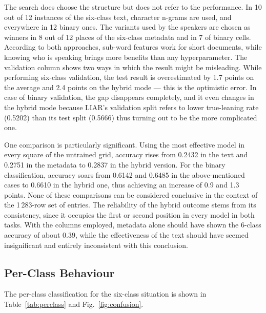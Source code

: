 \documentclass[10pt,twocolumn,twoside,a4paper]{article}
\begin{document}
The search does choose the structure but does not refer to the performance. In 10 out of 12 instances of the six-class text, character n-grams are used, and everywhere in 12 binary ones. The variants used by the speakers are chosen as winners in 8 out of 12 places of the six-class metadata and in 7 of binary cells. According to both approaches, sub-word features work for short documents, while knowing who is speaking brings more benefits than any hyperparameter. The validation column shows two ways in which the result might be misleading. While performing six-class validation, the test result is overestimated by 1.7 points on the average and 2.4 points on the hybrid mode --- this is the optimistic error. In case of binary validation, the gap disappears completely, and it even changes in the hybrid mode because LIAR's validation split refers to lower true-leaning rate (0.5202) than its test split (0.5666) thus turning out to be the more complicated one.

One comparison is particularly significant. Using the most effective model in every square of the untrained grid, accuracy rises from 0.2432 in the text and 0.2751 in the metadata to 0.2837 in the hybrid version. For the binary classification, accuracy soars from 0.6142 and 0.6485 in the above-mentioned cases to 0.6610 in the hybrid one, thus achieving an increase of 0.9 and 1.3 points. None of these comparisons can be considered conclusive in the context of the 1\,283-row set of entries. The reliability of the hybrid outcome stems from its consistency, since it occupies the first or second position in every model in both tasks. With the columns employed, metadata alone should have shown the 6-class accuracy of about 0.39, while the effectiveness of the text should have seemed insignificant and entirely inconsistent with this conclusion.

\subsection{Per-Class Behaviour}

The per-class classification for the six-class situation is shown in Table~\ref{tab:perclass} and Fig.~\ref{fig:confusion}.
\end{document}
